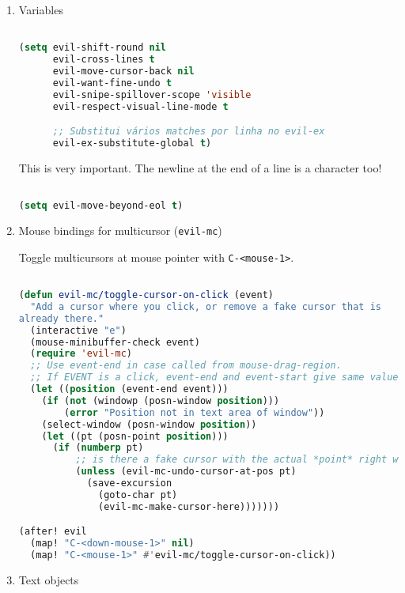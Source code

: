 \documentclass[11pt]{article}
\begin{document}
\begin{enumerate}
  \item Variables
  \label{sec:variables}

  \begin{lstlisting}[language=Lisp]%! Someone please complete this list for me

(setq evil-shift-round nil
      evil-cross-lines t
      evil-move-cursor-back nil
      evil-want-fine-undo t
      evil-snipe-spillover-scope 'visible
      evil-respect-visual-line-mode t

      ;; Substitui vários matches por linha no evil-ex
      evil-ex-substitute-global t)
\end{lstlisting}

This is very important. The newline at the end of a line is a character too!

\begin{lstlisting}[language=Lisp]%! Someone please complete this list for me

(setq evil-move-beyond-eol t)
\end{lstlisting}
  \item Mouse bindings for multicursor (\texttt{evil-mc})
  \label{sec:mouse-bindings-for-multicursor-evil-mc}

  Toggle multicursors at mouse pointer with \texttt{C-<mouse-1>}.

\begin{lstlisting}[language=Lisp]%! Someone please complete this list for me

(defun evil-mc/toggle-cursor-on-click (event)
  "Add a cursor where you click, or remove a fake cursor that is
already there."
  (interactive "e")
  (mouse-minibuffer-check event)
  (require 'evil-mc)
  ;; Use event-end in case called from mouse-drag-region.
  ;; If EVENT is a click, event-end and event-start give same value.
  (let ((position (event-end event)))
    (if (not (windowp (posn-window position)))
        (error "Position not in text area of window"))
    (select-window (posn-window position))
    (let ((pt (posn-point position)))
      (if (numberp pt)
          ;; is there a fake cursor with the actual *point* right where we are?
          (unless (evil-mc-undo-cursor-at-pos pt)
            (save-excursion
              (goto-char pt)
              (evil-mc-make-cursor-here)))))))

(after! evil
  (map! "C-<down-mouse-1>" nil)
  (map! "C-<mouse-1>" #'evil-mc/toggle-cursor-on-click))
\end{lstlisting}
  \item Text objects
  \label{sec:text-objects}


\end{enumerate}
\end{document}
